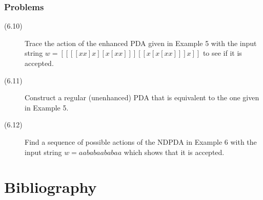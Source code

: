 \documentclass{article}
\begin{document}
\subsubsection*{Problems}

\begin{description}
  \item[(6.10)] Trace the action of the enhanced PDA given in Example 5 with the input string $w = [[[[xx]x][x[xx]]][[x[x[xx]]]x]]$ to see if it is accepted.
  \item[(6.11)] Construct a regular (unenhanced) PDA that is equivalent to the one given in Example 5.
  \item[(6.12)] Find a sequence of possible actions of the NDPDA in Example 6 with the input string $w = aababaababaa$ which shows that it is accepted.
\end{description}




\newpage


\section*{Bibliography}
\end{document}
